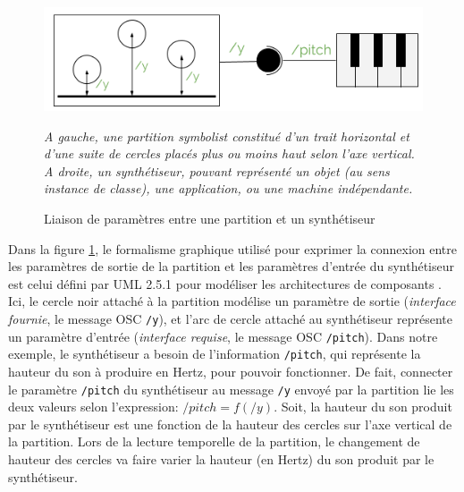 \begin{figure}[H]
	\centering
	\includegraphics[keepaspectratio=true, width=\textwidth]{StructurationRecherche/i/linkingParameters.png}
	\caption{Liaison de paramètres entre une partition et un synthétiseur}
	\label{fig:linkingParameters}
	\small
	\textit{ A gauche, une partition \textit{symbolist} constitué d'un trait horizontal et d'une suite de cercles placés plus ou moins haut selon l'axe vertical. A droite, un synthétiseur, pouvant représenté un objet (au sens instance de classe), une application, ou une machine indépendante. }
\end{figure}


Dans la figure \ref{fig:linkingParameters}, le formalisme graphique utilisé pour exprimer la connexion entre les paramètres de sortie de la partition et les paramètres d'entrée du synthétiseur est celui défini par UML 2.5.1 pour modéliser les architectures de composants \cite{omg2017}. Ici, le cercle noir attaché à la partition modélise un paramètre de sortie (\textit{interface fournie}, le message OSC \texttt{/y}), et l'arc de cercle attaché au synthétiseur représente un paramètre d'entrée (\textit{interface requise}, le message OSC \texttt{/pitch}).
Dans notre exemple, le synthétiseur a besoin de l'information \texttt{/pitch}, qui représente la hauteur du son à produire en Hertz, pour pouvoir fonctionner.
De fait, connecter le paramètre \texttt{/pitch} du synthétiseur au message \texttt{/y} envoyé par la partition lie les deux valeurs selon l'expression: $/pitch = f(/y)$. Soit, la hauteur du son produit par le synthétiseur est une fonction de la hauteur des cercles sur l'axe vertical de la partition.
Lors de la lecture temporelle de la partition, le changement de hauteur des cercles va faire varier la hauteur (en Hertz) du son produit par le synthétiseur. 